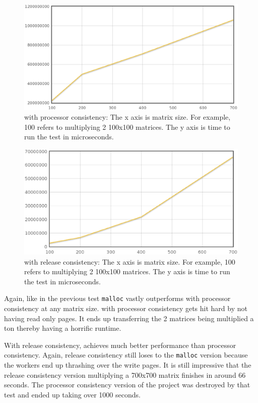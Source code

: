 \begin{figure}[!h]
\centering
\includegraphics[scale=0.40]{images/mmult-lh-fixed-thread.eps}
\caption{\projname{} with processor consistency: The x axis is matrix size. For example, 100 refers to multiplying 2 100x100 matrices. The y axis is time to run the test in microseconds.}
\label{hoard-pc-fixed-thread}
\end{figure}

\begin{figure}[!h]
\centering
\includegraphics[scale=0.40]{images/mmlh-fixed-threads.eps}
\caption{\projname{} with release consistency: The x axis is matrix size. For example, 100 refers to multiplying 2 100x100 matrices. The y axis is time to run the test in microseconds.}
\label{hoard-rc-fixed-thread}
\end{figure}

Again, like in the previous test \verb,malloc, vastly outperforms \projname{} with processor consistency at any matrix size. \projname{} with processor consistency gets hit hard by not having read only pages. It ends up transferring the 2 matrices being multiplied a ton thereby having a horrific runtime.

With release consistency, \projname{} achieves much better performance than processor consistency. Again, release consistency still loses to the \verb,malloc, version because the workers end up thrashing over the write pages. It is still impressive that the release consistency version multiplying a 700x700 matrix finishes in around 66 seconds. The processor consistency version of the project was destroyed by that test and ended up taking over 1000 seconds.
